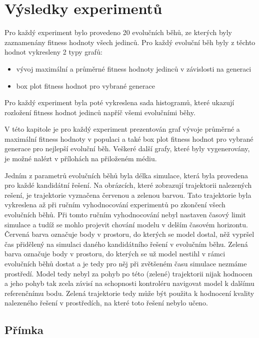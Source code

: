 \chapter{Výsledky experimentů}
Pro každý experiment bylo provedeno 20 evolučních běhů, ze kterých byly zaznamenány fitness hodnoty všech jedinců.
Pro každý evoluční běh byly z těchto hodnot vykresleny 2 typy grafů:

\begin{itemize}
    \item vývoj maximální a průměrné fitness hodnoty jedinců v závislosti na generaci
    \item box plot fitness hodnot pro vybrané generace
\end{itemize}

Pro každý experiment byla poté vykreslena sada histogramů, které ukazují rozložení fitness hodnot jedinců napříč všemi evolučními běhy.

V této kapitole je pro každý experiment prezentován graf vývoje průměrné a maximální fitness hodnoty v populaci a také box plot fitness hodnot pro vybrané generace pro nejlepší evoluční běh.
Veškeré další grafy, které byly vygenerovány, je možné nalézt v přílohách na přiloženém médiu.

Jedním z parametrů evolučních běhů byla délka simulace, která byla provedena pro každé kandidátní řešení.
Na obrázcích, které zobrazují trajektorii nalezených rešení, je trajektorie vyznačena červenou a zelenou barvou.
Tato trajektorie byla vykreslena až při ručním vyhodnocování experimentů po zkončení všech evolučních běhů.
Při tomto ručním vyhodnocování nebyl nastaven časový limit simulace a tudíž se mohlo projevit chování modelu v delším časovém horizontu.
Červená barva označuje body v prostoru, do kterých se model dostal, něž vypršel čas přidělený na simulaci daného kandidátního řešení v evolučním běhu.
Zelená barva označuje body v prostoru, do kterých se už model nestihl v rámci evolučních běhů dostat a je tedy pro něj při zvětšeném času simulace nezmáme prostředí.
Model tedy nebyl za pohyb po této (zelené) trajektorii nijak hodnocen a jeho pohyb tak zcela závisí na schopnosti kontroléru navigovat model k dalšímu referenčnímu bodu.
Zelená trajektorie tedy může být použita k hodnocení kvality nalezeného řešení v prostředích, na které toto řešení nebylo učeno.

\section{Přímka}

